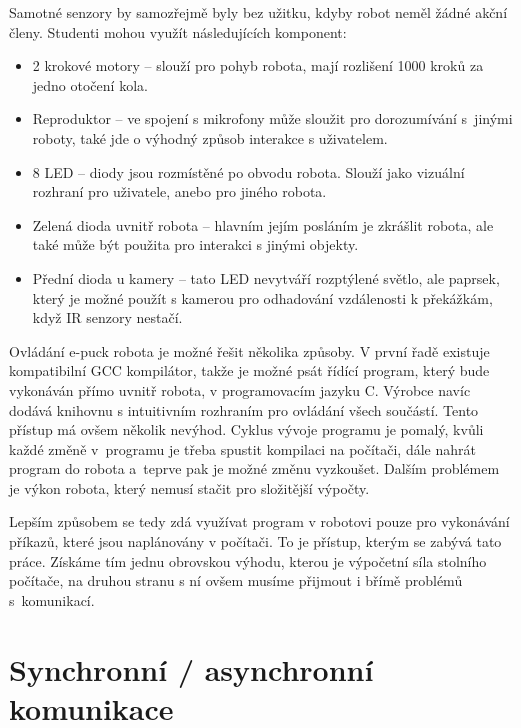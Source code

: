    Samotné senzory by samozřejmě byly bez užitku, kdyby robot neměl žádné
    akční členy. Studenti mohou využít následujících komponent:
    \begin{itemize}
        \item 2 krokové motory -- slouží pro pohyb robota, mají rozlišení 1000
        kroků za jedno otočení kola.

        \item Reproduktor -- ve spojení s mikrofony může sloužit pro
        dorozumívání s~jinými roboty, také jde o výhodný způsob interakce s
        uživatelem.

        \item 8 LED -- diody jsou rozmístěné po obvodu robota. Slouží jako
        vizuální rozhraní pro uživatele, anebo pro jiného robota.

        \item Zelená dioda uvnitř robota -- hlavním jejím posláním je zkrášlit
        robota, ale také může být použita pro interakci s jinými objekty.

        \item Přední dioda u kamery -- tato LED nevytváří rozptýlené světlo,
        ale paprsek, který je možné použít s kamerou pro odhadování vzdálenosti
        k překážkám, když IR senzory nestačí.
    \end{itemize}

    Ovládání e-puck robota je možné řešit několika způsoby. V první řadě
    existuje kompatibilní GCC kompilátor, takže je možné psát řídící program,
    který bude vykonáván přímo uvnitř robota, v programovacím jazyku C. Výrobce
    navíc dodává knihovnu s intuitivním rozhraním pro ovládání všech součástí.
    Tento přístup má ovšem několik nevýhod. Cyklus vývoje programu je pomalý,
    kvůli každé změně v~programu je třeba spustit kompilaci na počítači, dále
    nahrát program do robota a~teprve pak je možné změnu vyzkoušet. Dalším
    problémem je výkon robota, který nemusí stačit pro složitější výpočty.

    Lepším způsobem se tedy zdá využívat program v robotovi pouze pro
    vykonávání příkazů, které jsou naplánovány v počítači. To je přístup,
    kterým se zabývá tato práce. Získáme tím jednu obrovskou výhodu, kterou je
    výpočetní síla stolního počítače, na druhou stranu s ní ovšem musíme
    přijmout i břímě problémů s~komunikací.

    \section{Synchronní / asynchronní komunikace}
    \label{sync/async}

